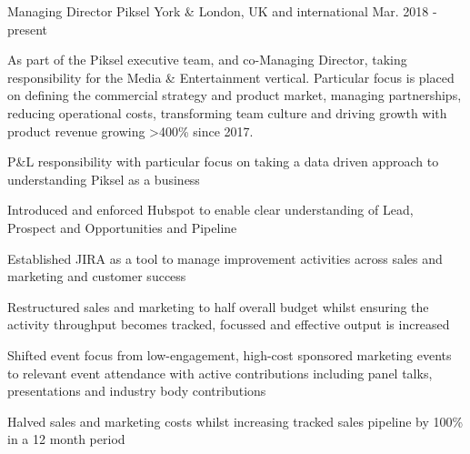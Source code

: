 


\begin{cventries}


\cvexpentry
{Managing Director} %
{Piksel} %
{York \& London, UK and international} %
{Mar. 2018 - present} %
{
\begin{cvitemstitle}
\item {As part of the Piksel executive team, and co-Managing Director, taking responsibility for the Media \& Entertainment vertical. Particular focus is placed on defining the commercial strategy and product market, managing partnerships, reducing operational costs, transforming team culture and driving growth with product revenue growing >400\% since 2017.}
\end{cvitemstitle}
}
{ %
\begin{cvitems}
\item {P\&L responsibility with particular focus on taking a data driven approach to understanding Piksel as a business}
\item {Introduced and enforced Hubspot to enable clear understanding of Lead, Prospect and Opportunities and Pipeline}
\item {Established JIRA as a tool to manage improvement activities across sales and marketing and customer success}
\item {Restructured sales and marketing to half overall budget whilst ensuring the activity throughput becomes tracked, focussed and effective output is increased}
\item {Shifted event focus from low-engagement, high-cost sponsored marketing events to relevant event attendance with active contributions including panel talks, presentations and industry body contributions}
\item {Halved sales and marketing costs whilst increasing tracked sales pipeline by 100\% in a 12 month period}
\end{cvitems}
}


\end{cventries}
